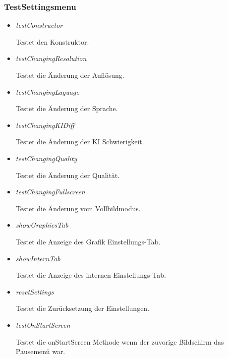 \subsubsection{TestSettingsmenu}
\begin{itemize}
    \item \textit{testConstructor}
        \begin{leftbar}[0.9\linewidth]
            Testet den Konstruktor.
        \end{leftbar}
    \item \textit{testChangingResolution}
        \begin{leftbar}[0.9\linewidth]
            Testet die Änderung der Auflösung.
        \end{leftbar}
    \item \textit{testChangingLaguage}
        \begin{leftbar}[0.9\linewidth]
            Testet die Änderung der Sprache.
        \end{leftbar}
    \item \textit{testChangingKIDiff}
        \begin{leftbar}[0.9\linewidth]
            Testet die Änderung der KI Schwierigkeit.
        \end{leftbar}
    \item \textit{testChangingQuality}
        \begin{leftbar}[0.9\linewidth]
            Testet die Änderung der Qualität.
        \end{leftbar}
    \item \textit{testChangingFullscreen}
        \begin{leftbar}[0.9\linewidth]
            Testet die Änderung vom Vollbildmodus.
        \end{leftbar}
    \item \textit{showGraphicsTab}
        \begin{leftbar}[0.9\linewidth]
            Testet die Anzeige des Grafik Einstellungs-Tab.
        \end{leftbar}
    \item \textit{showInternTab}
        \begin{leftbar}[0.9\linewidth]
            Testet die Anzeige des internen Einstellungs-Tab.
        \end{leftbar}
    \item \textit{resetSettings}
        \begin{leftbar}[0.9\linewidth]
            Testet die Zurücksetzung der Einstellungen.
        \end{leftbar}
    \pagebreak
    \item \textit{testOnStartScreen}
        \begin{leftbar}[0.9\linewidth]
            Testet die onStartScreen Methode wenn der zuvorige Bildschirm das Pausemenü war.
        \end{leftbar}
\end{itemize}

